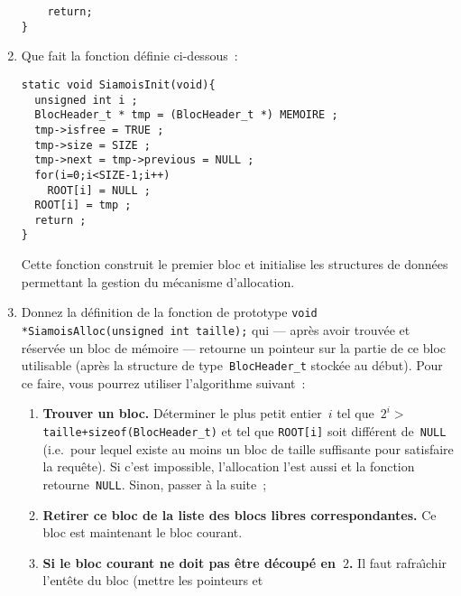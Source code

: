\begin{enumerate}
\begin{correction}
\begin{verbatim}
	return;
}
\end{verbatim}
\end{correction}
\fi
\item Que fait la fonction d\'efinie ci-dessous~:
\begin{verbatim}
static void SiamoisInit(void){
  unsigned int i ;
  BlocHeader_t * tmp = (BlocHeader_t *) MEMOIRE ;  
  tmp->isfree = TRUE ;
  tmp->size = SIZE ;
  tmp->next = tmp->previous = NULL ;
  for(i=0;i<SIZE-1;i++)
    ROOT[i] = NULL ;
  ROOT[i] = tmp ;
  return ;
}
\end{verbatim}
\ifcorrection
\begin{correction}
  Cette fonction construit le premier bloc et initialise les structures de donn\'ees permettant la gestion
du m\'ecanisme d'allocation.
\end{correction}
\fi
\item Donnez la d\'efinition de la fonction de prototype %
  \verb+void *SiamoisAlloc(unsigned int taille);+ qui --- apr\`es
  avoir trouv\'ee et r\'eserv\'ee un bloc de m\'emoire --- retourne un
  pointeur sur la partie de ce bloc utilisable (apr\`es la structure
  de type~\verb+BlocHeader_t+ stock\'ee au d\'ebut). Pour ce faire,
  vous pourrez utiliser l'algorithme suivant~:
  \begin{enumerate}
  \item\textbf{Trouver un bloc.} D\'eterminer le plus petit
    entier~$i$ tel que~$2^i>$\verb?taille+sizeof(BlocHeader_t)? et tel
    que \verb+ROOT[i]+ soit diff\'erent de~\verb+NULL+ (i.e.\ pour
    lequel existe au moins un bloc de taille suffisante pour satisfaire
    la requ\^ete). Si c'est impossible, l'allocation l'est aussi et la
    fonction retourne~\verb+NULL+. Sinon, passer \`a la suite~;
  \item \textbf{Retirer ce bloc de la liste des blocs libres
      correspondantes.} Ce bloc est maintenant le bloc courant.
  \item \textbf{Si le bloc courant ne doit pas \^etre d\'ecoup\'e en~$2$.} 
    Il faut rafra\^\i{}chir l'ent\^ete du bloc (mettre les pointeurs et

\end{enumerate}
\end{enumerate}
